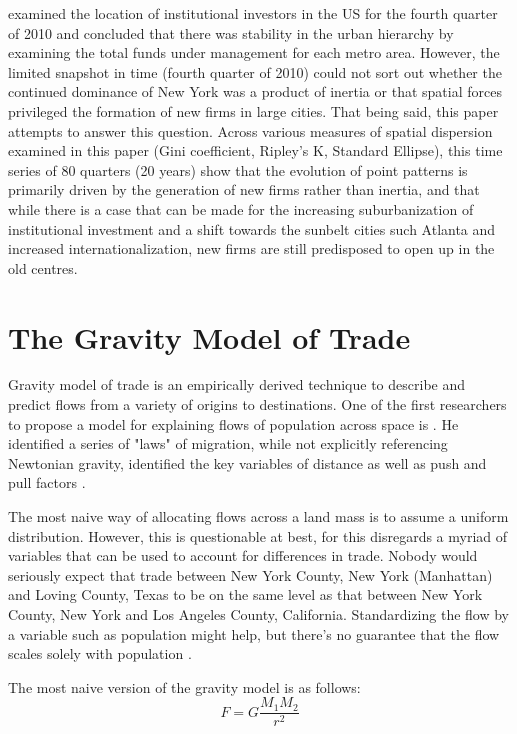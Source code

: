 \cite{GreenOLef2014} examined the location of institutional investors in the US for the fourth quarter of 2010 and concluded that there was stability in the urban hierarchy by examining the total funds under management for each metro area.  However, the limited snapshot in time (fourth quarter of 2010) could not sort out whether the continued dominance of New York was a product of inertia or that spatial forces privileged the formation of new firms in large cities.  That being said, this paper attempts to answer this question.  Across various measures of spatial dispersion examined in this paper (Gini coefficient, Ripley's K, Standard Ellipse),  this time series of 80 quarters (20 years) show that the evolution of point patterns is primarily driven by the generation of new firms rather than inertia, and that while there is a case that can be made for the increasing suburbanization  of institutional investment and a shift towards the sunbelt cities such Atlanta and increased internationalization, new firms are still predisposed to open up in the old centres.


\section{The Gravity Model of Trade}


Gravity model of trade is an empirically derived technique to describe and predict flows from a variety of origins to destinations.  One of the first researchers to propose a model for explaining flows of population across space is  \cite{ravenstein1885laws}. He identified a series of "laws" of migration, while not explicitly referencing Newtonian gravity, identified the key variables of distance as well as push and pull factors \citep{Tobler1995}.  

The most naive way of allocating flows across a land mass is to assume a uniform distribution.  However, this is questionable at best, for this disregards a myriad of variables that can be used to account for differences in trade.  Nobody would seriously expect that trade between New York County, New York (Manhattan) and Loving County, Texas to be on the same level as that between New York County, New York and Los Angeles County, California.  Standardizing the flow by a variable such as population might help, but there's no guarantee that the flow scales solely with population \citep{Crymble19}.   

The most naive version of the gravity model is as follows:
\begin{equation}
F = G \frac{M_{1}M_{2}}{r^{2}}
\label{Naive_Gravity_Model}
\end{equation}  

